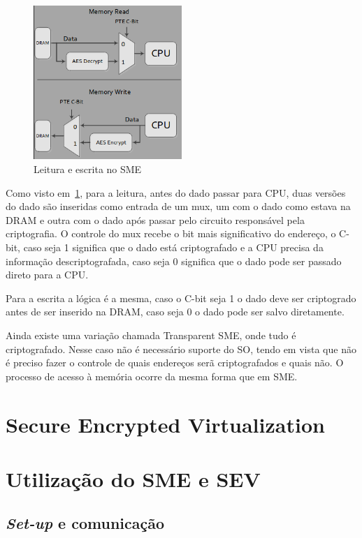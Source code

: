 \documentclass{report}
\begin{document}
\begin{figure}[h]
    \centering
    \includegraphics[width=0.5\textwidth]{img/sme_read_write_architecture}
    \caption{Leitura e escrita no SME}\label{sme-read-write}
\end{figure}

Como visto em~\ref{sme-read-write}, para a leitura, antes do dado passar para
CPU, duas versões do dado são inseridas como entrada de um mux, um com o dado
como estava na DRAM e outra com o dado após passar pelo circuito responsável
pela criptografia. O controle do mux recebe o bit mais significativo do
endereço, o C-bit, caso seja 1 significa que o dado está criptografado e a CPU
precisa da informação descriptografada, caso seja 0 significa que o dado pode
ser passado direto para a CPU\@.

Para a escrita a lógica é a mesma, caso o C-bit seja 1 o dado deve ser
criptogrado antes de ser inserido na DRAM, caso seja 0 o dado pode ser salvo
diretamente.

Ainda existe uma variação chamada Transparent SME, onde tudo é criptografado.
Nesse caso não é necessário suporte do SO, tendo em vista que não é preciso
fazer o controle de quais endereços serã criptografados e quais não. O processo
de acesso à memória ocorre da mesma forma que em SME\@.


\section{Secure Encrypted Virtualization}

\section{Utilização do SME e SEV}

\subsection{\textit{Set-up} e comunicação}
\end{document}
